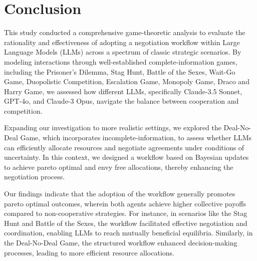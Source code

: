 \section{Conclusion}
This study conducted a comprehensive game-theoretic analysis to evaluate the rationality and effectiveness of adopting a negotiation workflow within Large Language Models (LLMs) across a spectrum of classic strategic scenarios. By modeling interactions through well-established complete-information games, including the Prisoner's Dilemma, Stag Hunt, Battle of the Sexes, Wait-Go Game, Duopolistic Competition, Escalation Game, Monopoly Game, Draco and Harry Game, we assessed how different LLMs, specifically Claude-3.5 Sonnet, GPT-4o, and Claude-3 Opus, navigate the balance between cooperation and competition.

Expanding our investigation to more realistic settings, we explored the Deal-No-Deal Game, which incorporates incomplete-information, to assess whether LLMs can efficiently allocate resources and negotiate agreements under conditions of uncertainty. In this context, we designed a workflow based on Bayesian updates to achieve pareto optimal and envy free allocations, thereby enhancing the negotiation process.


Our findings indicate that the adoption of the workflow generally promotes pareto optimal outcomes, wherein both agents achieve higher collective payoffs compared to non-cooperative strategies. For instance, in scenarios like the Stag Hunt and Battle of the Sexes, the workflow facilitated effective negotiation and coordination, enabling LLMs to reach mutually beneficial equilibria. Similarly, in the Deal-No-Deal Game, the structured workflow enhanced decision-making processes, leading to more efficient resource allocations.
